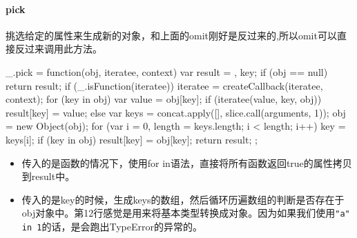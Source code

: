 \paragraph{pick}挑选给定的属性来生成新的对象，和上面的omit刚好是反过来的,所以omit可以直接反过来调用此方法。
\begin{JavaScript}
  _.pick = function(obj, iteratee, context) {
    var result = {}, key;
    if (obj == null) return result;
    if (_.isFunction(iteratee)) {
      iteratee = createCallback(iteratee, context);
      for (key in obj) {
        var value = obj[key];
        if (iteratee(value, key, obj)) result[key] = value;
      }
    } else {
      var keys = concat.apply([], slice.call(arguments, 1));
      obj = new Object(obj);
      for (var i = 0, length = keys.length; i < length; i++) {
        key = keys[i];
        if (key in obj) result[key] = obj[key];
      }
    }
    return result;
  };
\end{JavaScript}
\begin{itemize}
\item 传入的是函数的情况下，使用for in语法，直接将所有函数返回true的属性拷贝到result中。
\item 传入的是key的时候，生成keys的数组，然后循环历遍数组的判断是否存在于obj对象中。第12行感觉是用来将基本类型转换成对象。因为如果我们使用\lstinline!"a" in 1!的话，是会跑出TypeError的异常的。
\end{itemize}

